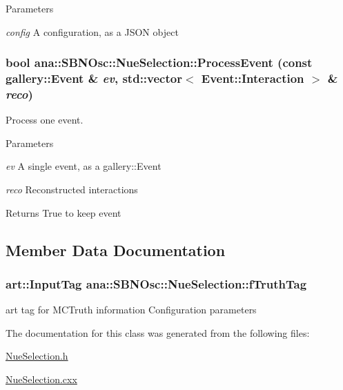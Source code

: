 \begin{DoxyParams}{Parameters}
\item[{\em config}]A configuration, as a JSON object \end{DoxyParams}
\hypertarget{classana_1_1SBNOsc_1_1NueSelection_a5c633a75ee3f7bdbcb5b09c253595377}{
\subsubsection[{ProcessEvent}]{\setlength{\rightskip}{0pt plus 5cm}bool ana::SBNOsc::NueSelection::ProcessEvent (const gallery::Event \& {\em ev}, \/  std::vector$<$ Event::Interaction $>$ \& {\em reco})}}
\label{classana_1_1SBNOsc_1_1NueSelection_a5c633a75ee3f7bdbcb5b09c253595377}
Process one event.


\begin{DoxyParams}{Parameters}
\item[{\em ev}]A single event, as a gallery::Event \item[{\em reco}]Reconstructed interactions \end{DoxyParams}
\begin{DoxyReturn}{Returns}
True to keep event 
\end{DoxyReturn}


\subsection{Member Data Documentation}
\hypertarget{classana_1_1SBNOsc_1_1NueSelection_ae339e3e05a25bb103543328f4d6c62ae}{
\subsubsection[{fTruthTag}]{\setlength{\rightskip}{0pt plus 5cm}art::InputTag {\bf ana::SBNOsc::NueSelection::fTruthTag}}}
\label{classana_1_1SBNOsc_1_1NueSelection_ae339e3e05a25bb103543328f4d6c62ae}


art tag for MCTruth information Configuration parameters 

The documentation for this class was generated from the following files:\begin{DoxyCompactItemize}
\item 
\hyperlink{NueSelection_8h}{NueSelection.h}\item 
\hyperlink{NueSelection_8cxx}{NueSelection.cxx}\end{DoxyCompactItemize}
